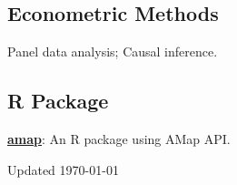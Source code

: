 \documentclass[12pt,letterpaper]{report}
\newcommand{\listitemspace}{0.35em}
\renewenvironment{itemize}
{\begin{list}{}{\setlength{\leftmargin}{0em}
            \setlength{\parskip}{0em}
            \setlength{\itemsep}{\listitemspace}
            \setlength{\parsep}{\listitemspace}}}
    {\end{list}}
\begin{document}
    \subsection*{Econometric Methods}

    \begin{itemize}

        \item Panel data analysis; Causal inference.

    \end{itemize}

    \subsection*{R Package}
    \begin{itemize}

 	\item \href{https://github.com/xiaojunlin/amap}{\textbf{amap}}: An R package using AMap API. 

    \end{itemize}

    \begin{center}
        \vfill
        Updated \monthyeardate\today
    \end{center}
\end{document}
